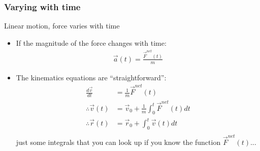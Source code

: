 \documentclass[aspectratio=169,
hyperref={colorlinks,urlcolor=blue}
]{beamer}
\begin{document}
\subsubsection{Varying with time}
\label{subsubsec:varyingwithtime}
\begin{frame}{Linear motion, force varies with time}
\begin{itemize}
\item If the magnitude of the force changes with time:
\begin{align*}
\vec a(t)=\frac{\vec F^{net}(t)}{m}
\end{align*}
\item The kinematics equations are ``straightforward'':
\begin{align*}
\frac{d\vec v}{dt}&=\frac{1}{m}\vec F^{net}(t)\\
\therefore \vec v(t)&=\vec v_0+\frac{1}{m}\int_0^t \vec F^{net}(t) dt\\
\therefore \vec r(t)&=\vec r_0+\int_0^t \vec v(t) dt\\
\end{align*}
just some integrals that you can look up if you know the function $\vec F^{net}(t)$...
\end{itemize}

\end{frame}




\end{document}
